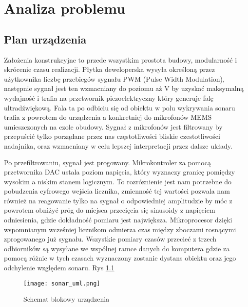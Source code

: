 \chapter[Analiza problemu]{Analiza problemu}

\label{chapter:analiza_problemu}



\section{Plan urządzenia}

Założenia konstrukcyjne to przede wszystkim prostota budowy, modularność i skrócenie czasu realizacji. 
Płytka deweloperska wysyła określoną przez użytkownika liczbę przebiegów sygnału PWM (Pulse Width Modulation), 
następnie sygnał jest ten wzmacniany 
do poziomu aż \unit[80]{V} by uzyskać maksymalną wydajność i trafia na przetwornik piezoelektryczny który generuje falę ultradźwiękową.
Fala ta po odbiciu się od obiektu w polu wykrywania sonaru trafia z powrotem do urządzenia a konkretniej do mikrofonów MEMS umieszczonych na czole obudowy.
Sygnał z mikrofonów jest filtrowany by przepuścić tylko porządane przez nas częstotliwości bliskie czestotliwości nadajnika, 
oraz wzmacniany w celu lepszej interpretacji przez dalsze układy.

Po przefiltrowaniu, sygnał jest progowany. Mikrokontroler za pomocą przetwornika DAC ustala poziom napięcia, 
który wyznaczy granicę pomiędzy wysokim a niskim stanem logicznym. To rozróznienie jest nam potrzebne do pobudzenia cyfrowego wejścia licznika, 
zmienność tej wartości pozwala nam również na reagowanie tylko na sygnał o odpowiedniej amplitudzie by móc z powrotem obniżyć próg 
do miejsca przecięcia się sinusoidy z napięciem odniesienia, gdzie dokładność pomiaru jest największa.
Mikroprocesor dzięki wspomnianym wcześniej licznikom odmierza czas między zboczami rosnącymi zprogowanego już sygnału.
Wszystkie pomiary czasów przecieć z trzech odbiorników są wysyłane we wspólnej ramce danych do komputera gdzie za pomocą 
różnic w tych czasach wyznaczony zostanie dystans obiektu oraz jego odchylenie względem sonaru. Rys \ref{fig:uml}
\begin{figure}[ht!]
    \centering
    \texttt{[image: sonar\_uml.png]}
    \caption{Schemat blokowy urządzenia}
    \label{fig:uml}
\end{figure}



